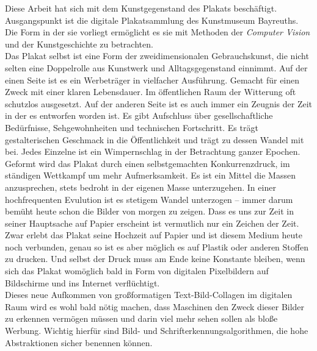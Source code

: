 \documentclass[a4paper,12pt,ngerman]{article}
\begin{document}
Diese Arbeit hat sich mit dem Kunstgegenstand des Plakats beschäftigt. Ausgangspunkt ist die digitale Plakatsammlung des Kunstmuseum Bayreuths. Die Form in der sie vorliegt ermöglicht es sie mit Methoden der \textit{Computer Vision} und der Kunstgeschichte zu betrachten. \\
Das Plakat selbst ist eine Form der zweidimensionalen Gebrauchskunst, die nicht selten eine Doppelrolle aus Kunstwerk und Alltagsgegenstand einnimmt. Auf der einen Seite ist es ein Werbeträger in vielfacher Ausführung. Gemacht für einen Zweck mit einer klaren Lebensdauer. Im öffentlichen Raum der Witterung oft schutzlos ausgesetzt. Auf der anderen Seite ist es auch immer ein Zeugnis der Zeit in der es entworfen worden ist. Es gibt Aufschluss über gesellschaftliche Bedürfnisse, Sehgewohnheiten und technischen Fortschritt. Es trägt gestalterischen Geschmack in die Öffentlichkeit und trägt zu dessen Wandel mit bei. Jedes Einzelne ist ein Wimpernschlag in der Betrachtung ganzer Epochen. Geformt wird das Plakat durch einen selbstgemachten Konkurrenzdruck, im ständigen Wettkampf um mehr Aufmerksamkeit. Es ist ein Mittel die Massen anzusprechen, stets bedroht in der eigenen Masse unterzugehen. In einer hochfrequenten Evulution ist es stetigem Wandel unterzogen -- immer darum bemüht heute schon die Bilder von morgen zu zeigen. Dass es uns zur Zeit in seiner Hauptsache auf Papier erscheint ist vermutlich nur ein Zeichen der Zeit. Zwar erlebt das Plakat seine Hochzeit auf Papier und ist diesem Medium heute noch verbunden, genau so ist es aber möglich es auf Plastik oder anderen Stoffen zu drucken. Und selbst der Druck muss am Ende keine Konstante bleiben, wenn sich das Plakat womöglich bald in Form von digitalen Pixelbildern auf Bildschirme und ins Internet verflüchtigt. \\
Dieses neue Aufkommen von großformatigen Text-Bild-Collagen im digitalen Raum wird es wohl bald nötig machen, dass Maschinen den Zweck dieser Bilder zu erkennen vermögen müssen und darin viel mehr sehen sollen als bloße Werbung. Wichtig hierfür sind Bild- und Schrifterkennungsalgorithmen, die hohe Abstraktionen sicher benennen können. \\
\end{document}
